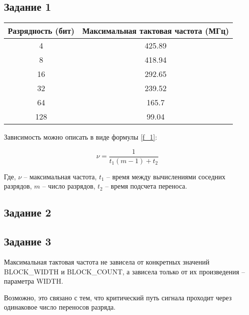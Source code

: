 \documentclass[a4paper,14pt]{article}
\begin{document}
	\subsection{Задание 1}
	
	\begin{table}[H]
		\begin{center}
			\begin{flushleft}
			\end{flushleft}
			\label{tab:task_1}
			\begin{tabular}{|c|c|}
				\hline
				Разрядность (бит)   & Максимальная тактовая частота (МГц)      \\ \hline
				4   & 425.89 \\ \hline
				8   & 418.94 \\ \hline
				16  & 292.65 \\ \hline
				32  & 239.52 \\ \hline
				64  & 165.7  \\ \hline
				128 & 99.04  \\ \hline
			\end{tabular}
		\end{center}
	\end{table}

	Зависимость можно описать  в виде формулы \ref{f_1}:

	\begin{equation}
	\nu = \dfrac{1}{t_1(m - 1) + t_2}
	\label{f_1}
	\end{equation}

	Где, $\nu$ -- максимальная частота, $t_1$ -- время между вычислениями соседних разрядов, $m$ -- число разрядов, $t_2$ -- время подсчета переноса.
	
	\subsection{Задание 2}
	
	
	\subsection{Задание 3}
	
	Максимальная тактовая частота не зависела от конкретных значений BLOCK\_WIDTH и BLOCK\_COUNT,
	а зависела только от их произведения -- параметра WIDTH.
	
	Возможно, это связано с тем, что критический путь сигнала проходит через одинаковое число переносов разряда.
	
\end{document}
